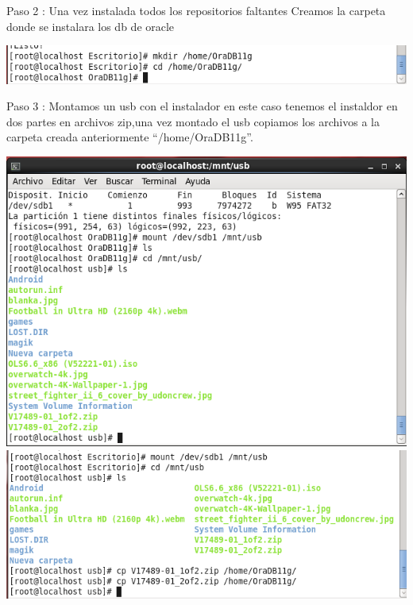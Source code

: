 \documentclass[a4paper,openright,12pt]{book}
\begin{document}
\begin{center}
\end{center}

Paso 2 : Una vez instalada todos los repositorios faltantes Creamos la carpeta donde se instalara los db de oracle

\begin{center}
\includegraphics[width=15cm]{./oracle linux/4.png}
\end{center}
Paso 3 : Montamos un usb con el instalador en este caso tenemos el instaldor en dos partes en archivos zip,una vez montado el usb copiamos los archivos a la carpeta creada anteriormente “/home/OraDB11g”.

\begin{center}
\includegraphics[width=15cm]{./oracle linux/5.png}
\includegraphics[width=15cm]{./oracle linux/6.png}
\end{center}
\end{document}
